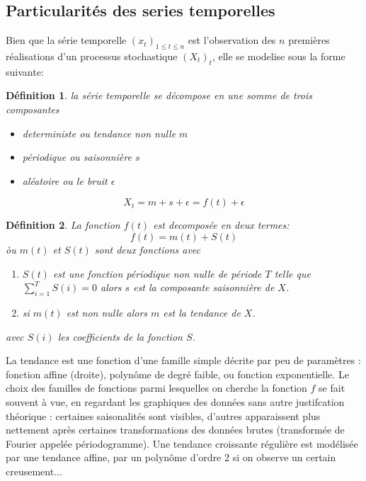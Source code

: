 \documentclass[onecolumn, 12pt]{book}
\newtheorem{definition}{D\'efinition}
\begin{document}
\subsection{Particularit\'es des series temporelles}
Bien que la s\'erie temporelle $(x_t)_{1 \le t \le n}$ est l'observation des $n$ premi\`eres r\'ealisations d'un processus stochastique $(X_t)_t$, elle se modelise sous la forme suivante:
\begin{definition}
la s\'erie temporelle se d\'ecompose en une somme de trois composantes 
\begin{itemize}
	\item deterministe ou tendance  non nulle $m$
	\item p\'eriodique ou saisonni\`ere $s$
	\item al\'eatoire ou le bruit $\epsilon$
\end{itemize}
\begin{equation}
 X_t = m + s + \epsilon = f(t) + \epsilon
\end{equation}
\end{definition}
\begin{definition}
La fonction $f(t)$ est decompos\'ee en deux termes: 
\begin{equation}
	f(t) = m(t) + S(t)
\end{equation}
\`ou $m(t)$ et $S(t)$ sont deux fonctions avec 
\begin{enumerate}
	\item  $S(t)$ est une fonction p\'eriodique non nulle de p\'eriode $T$ telle que $\sum_{i = 1}^{T}S(i) = 0$ alors $s$ est la composante saisonni\`ere de $X$.
	\item si $m(t)$ est non nulle alors $m$ est la tendance de $X$.
\end{enumerate}
avec $S(i)$ les coefficients de la fonction $S$.
\end{definition}
La tendance est une fonction d'une famille simple d\'ecrite par peu de param\`etres : fonction affine (droite), polyn\^ome de degr\'e faible, ou fonction exponentielle. 
Le choix des familles de fonctions parmi lesquelles on cherche la fonction $f$
se fait souvent \`a vue, en regardant les graphiques des donn\'ees sans autre justifcation
th\'eorique : certaines saisonalit\'es sont visibles, d'autres apparaissent plus nettement apr\`es certaines transformations des donn\'ees brutes (transform\'ee de Fourier appel\'ee p\'eriodogramme). 
Une tendance croissante r\'eguli\`ere est mod\'elis\'ee par une tendance affine, par un polyn\^ome d'ordre $2$ si on observe un certain creusement... 
\end{document}

